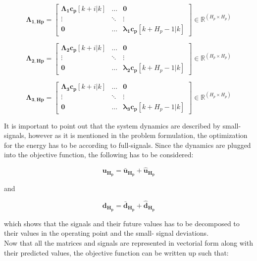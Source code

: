 \begin{equation}
\bm{\Lambda_{1,Hp}} =
 \begin{bmatrix}
 \bm{\Lambda_1} \bm{c_p}[k+i|k] & \hdots & \bm{0} \\
 \vdots & \ddots & \vdots\\
 \bm{0} & \hdots & \bm{\lambda_1 c_p}[k+H_p-1|k] 
 \end{bmatrix}
 \in \pmb{\mathbb{R}}^{(H_p \times H_p)}
\end{equation} 


\begin{equation}
\bm{\Lambda_{2,Hp}} =
 \begin{bmatrix}
 \bm{\Lambda_2} \bm{c_p}[k+i|k] & \hdots & \bm{0} \\
 \vdots & \ddots & \vdots\\
 \bm{0} & \hdots & \bm{\lambda_2 c_p}[k+H_p-1|k] 
 \end{bmatrix}
 \in \pmb{\mathbb{R}}^{(H_p \times H_p)}
\end{equation} 


\begin{equation}
\bm{\Lambda_{3,Hp}} =
 \begin{bmatrix}
 \bm{\Lambda_3} \bm{c_p}[k+i|k] & \hdots & \bm{0} \\
 \vdots & \ddots & \vdots\\
 \bm{0} & \hdots & \bm{\lambda_3 c_p}[k+H_p-1|k] 
 \end{bmatrix}
 \in \pmb{\mathbb{R}}^{(H_p \times H_p)}
\end{equation} 

It is important to point out that the system dynamics are described by small-signals, however as it is mentioned in the problem formulation, the optimization for the energy has to be according to full-signals. Since the dynamics are plugged into the objective function, the following has to be considered: 

\begin{equation}
\bm{u_{H_{p}}} = \bm{\bar{u}_{H_{p}}} + \bm{\hat{u}_{H_{p}}}
\label{u_pred}
\end{equation}

and

\begin{equation}
\bm{d_{H_{p}}} = \bm{\bar{d}_{H_{p}}} + \bm{\hat{d}_{H_{p}}}
\end{equation}

which shows that the signals and their future values has to be decomposed to their values in the operating point and the small- signal deviations. 
\\
Now that all the matrices and signals are represented in vectorial form along with their predicted values, the objective function can be written up such that:

